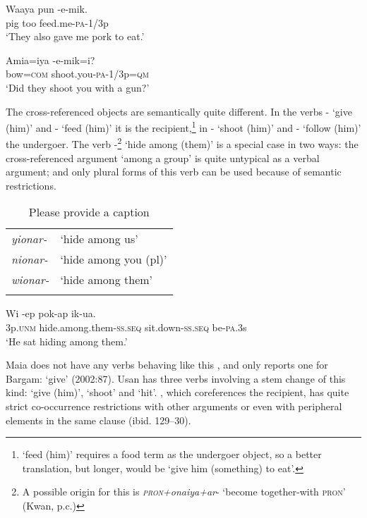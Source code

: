 \ea%
\label{ex:3:x335}
\gll Waaya pun -e-mik. \\
pig too feed.me-\textsc{pa}-1/3p \\
\glt`They also gave me pork to eat.'
\z

\ea%
\label{ex:3:x336}
\gll Amia=iya -e-mik=i? \\
bow=\textsc{com} shoot.you-\textsc{pa}-1/3p=\textsc{qm}\\
\glt`Did they shoot you with a gun?'
\z

The cross-referenced objects are semantically quite different. In the verbs - `give (him)' and - `feed (him)' it is the recipient,\footnote{ `feed (him)' requires a food term as the undergoer object, so a better translation, but longer, would be `give him (something) to eat'.} in - `shoot (him)' and - `follow (him)' the undergoer. The verb -\footnote{A possible origin for this is \textit{\textsc{pron}+onaiya+ar}- `become together-with \textsc{pron}' (Kwan, p.c.)} `hide among (them)' is a special case in two ways: the cross-referenced argument `among a group' is quite untypical as a verbal argument; and only plural forms of this verb can be used because of semantic restrictions. 

\begin{table}
\caption{Please provide a caption}
 
\begin{tabular}{>{\itshape}ll}
\mytoprule
yionar- &`hide among us'\\
nionar- &`hide among you (pl)'\\
wionar- &`hide among them'\\
\mybottomrule
\end{tabular}

\end{table}

\ea%
\label{ex:3:x337}
\gll Wi -ep pok-ap ik-ua. \\
3p.\textsc{unm} hide.among.them-\textsc{ss}.\textsc{seq} sit.down-\textsc{ss}.\textsc{seq} be-\textsc{pa}.3s \\
\glt`He sat hiding among them.'
\z

Maia does not have any verbs behaving like this \citep{Hardin2002}, and \citeauthor{Hepner2002} only reports one for Bargam:  `give' (2002:87). Usan has three verbs involving a stem change of this kind:  `give (him)',  `shoot' and  `hit'\citep[44]{Reesink1987}. , which coreferences the recipient, has quite strict co-occurrence restrictions with other arguments or even with peripheral elements in the same clause (ibid. 129--30). 

